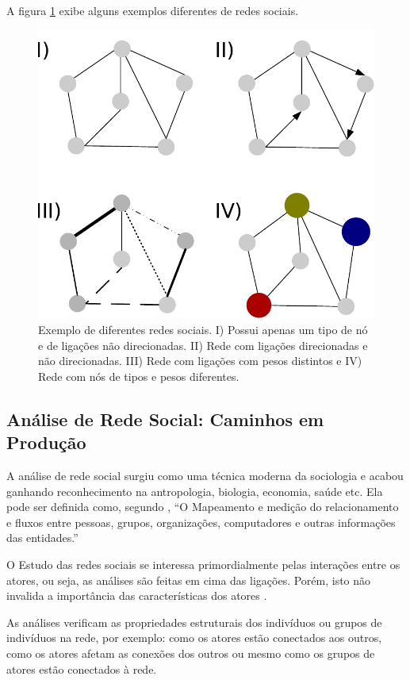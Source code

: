 A figura \ref{fig:graph-types} exibe alguns exemplos diferentes de redes sociais.

\begin{figure}[htbp]
\centering
 \includegraphics[width=.85\textwidth]{figuras/tipos.pdf}
 \caption{Exemplo de diferentes redes sociais. I) Possui apenas um tipo de nó e de ligações não direcionadas. II) Rede com ligações direcionadas e não direcionadas. III) Rede com ligações com pesos distintos e IV) Rede com nós de tipos e pesos diferentes.}
\label{fig:graph-types}
\end{figure}

\subsection{Análise de Rede Social: Caminhos em Produção}
A análise de rede social surgiu como uma técnica moderna da sociologia e acabou ganhando reconhecimento na antropologia, biologia, economia, saúde etc. Ela pode ser definida como, segundo , ``O Mapeamento e medição do relacionamento e fluxos entre pessoas, grupos, organizações, computadores e outras informações das entidades.''

O Estudo das redes sociais se interessa primordialmente pelas interações entre os atores, ou seja, as análises são feitas em cima das ligações. Porém, isto não invalida a importância das características dos atores \cite{pan2007effective}.

As análises verificam as propriedades estruturais dos indivíduos ou grupos de indivíduos na rede, por exemplo: como os atores estão conectados aos outros, como os atores afetam as conexões dos outros ou mesmo como os grupos de atores estão conectados à rede.

